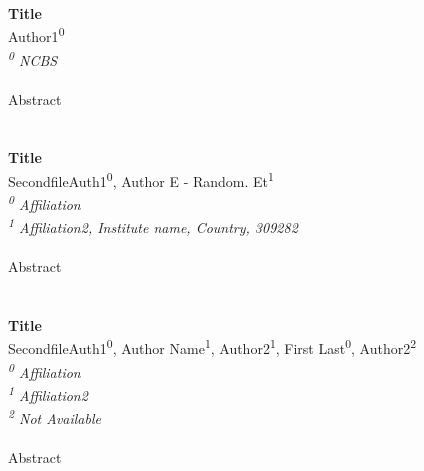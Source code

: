 \textbf{Title} \\ {\small Author1\textsuperscript{0}} \\ \textit{{\scriptsize \textsuperscript{0} NCBS}} \\  \\ \indent Abstract  \\ 
\\\\
\textbf{Title} \\ {\small SecondfileAuth1\textsuperscript{0}, Author E - Random. Et\textsuperscript{1}} \\ \textit{{\scriptsize \textsuperscript{0} Affiliation\\\textsuperscript{1} Affiliation2, Institute name, Country, 309282}} \\  \\ \indent Abstract  \\ 
\\\\
\textbf{Title} \\ {\small SecondfileAuth1\textsuperscript{0}, Author Name\textsuperscript{1}, Author2\textsuperscript{1}, First Last\textsuperscript{0}, Author2\textsuperscript{2}} \\ \textit{{\scriptsize \textsuperscript{0} Affiliation\\\textsuperscript{1} Affiliation2\\\textsuperscript{2} Not Available}} \\  \\ \indent Abstract  \\ 
\\\\
